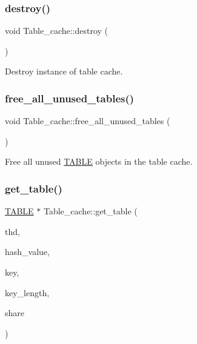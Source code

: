 \subsubsection{\texorpdfstring{destroy()}{destroy()}}
{\footnotesize\ttfamily void Table\+\_\+cache\+::destroy (\begin{DoxyParamCaption}\item[{void}]{ }\end{DoxyParamCaption})}

Destroy instance of table cache. \mbox{\label{classTable__cache_a761f02e59e45c74fdaf47815ed01ce09}} 
\subsubsection{\texorpdfstring{free\+\_\+all\+\_\+unused\+\_\+tables()}{free\_all\_unused\_tables()}}
{\footnotesize\ttfamily void Table\+\_\+cache\+::free\+\_\+all\+\_\+unused\+\_\+tables (\begin{DoxyParamCaption}{ }\end{DoxyParamCaption})}

Free all unused \mbox{\hyperlink{structTABLE}{T\+A\+B\+LE}} objects in the table cache. \mbox{\label{classTable__cache_a9edaddf4d6af456120fcb89a30bce264}} 
\subsubsection{\texorpdfstring{get\+\_\+table()}{get\_table()}}
{\footnotesize\ttfamily \mbox{\hyperlink{structTABLE}{T\+A\+B\+LE}} $\ast$ Table\+\_\+cache\+::get\+\_\+table (\begin{DoxyParamCaption}\item[{T\+HD $\ast$}]{thd,  }\item[{my\+\_\+hash\+\_\+value\+\_\+type}]{hash\+\_\+value,  }\item[{const char $\ast$}]{key,  }\item[{size\+\_\+t}]{key\+\_\+length,  }\item[{\mbox{\hyperlink{structTABLE__SHARE}{T\+A\+B\+L\+E\+\_\+\+S\+H\+A\+RE}} $\ast$$\ast$}]{share }\end{DoxyParamCaption})\hspace{0.3cm}{\ttfamily [inline]}}

